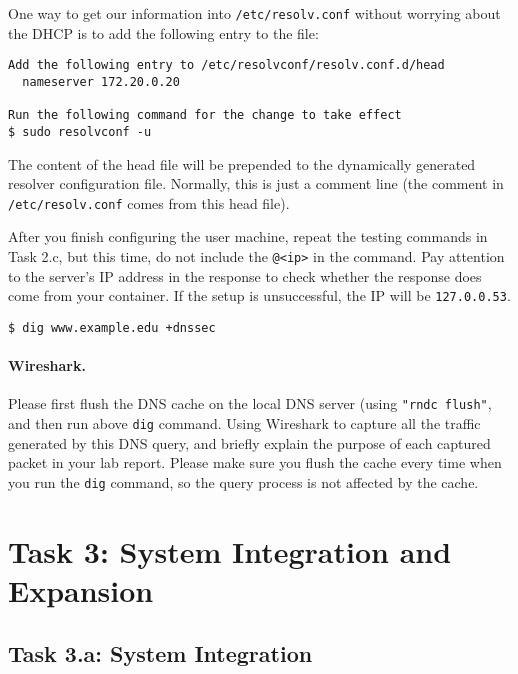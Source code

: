 One way to get our information into \texttt{/etc/resolv.conf} without worrying about
the DHCP is to add the following entry to the 
file:


\begin{lstlisting}
Add the following entry to /etc/resolvconf/resolv.conf.d/head
  nameserver 172.20.0.20

Run the following command for the change to take effect
$ sudo resolvconf -u
\end{lstlisting}

The content of the head file will be prepended to the dynamically generated resolver
configuration file. Normally, this is just a comment line (the comment in
\texttt{/etc/resolv.conf} comes from this head file).


After you finish configuring the user machine, repeat
the testing commands in Task 2.c, but this time, do not
include the \texttt{@<ip>} in the command. Pay attention to
the server's IP address in the response to check whether the response does
come from your container. If the setup is unsuccessful,
the IP will be \texttt{127.0.0.53}.

\begin{lstlisting}
$ dig www.example.edu +dnssec
\end{lstlisting}

\paragraph{Wireshark.} Please first flush the DNS cache on the local DNS server (using 
\texttt{"rndc flush"}, and then run above \texttt{dig} command. Using 
Wireshark to capture all the traffic generated by this DNS query, and briefly explain
the purpose of each captured packet in your lab report.  Please make sure you flush the 
cache every time when you run the \texttt{dig} command, so the query process is not 
affected by the cache. 




\section{Task 3: System Integration and Expansion}



\subsection{Task 3.a: System Integration}



